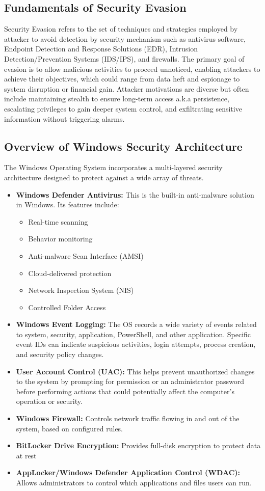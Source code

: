 \documentclass[11pt]{article}
\begin{document}
			\subsection{Fundamentals of Security Evasion}
			Security Evasion refers to the set of techniques and strategies employed by attacker to avoid detection by security mechanism such as antivirus software, Endpoint Detection and Response Solutions (EDR), Intrusion Detection/Prevention Systems (IDS/IPS), and firewalls. The primary goal of evasion is to allow malicious activities to proceed unnoticed, enabling attackers to achieve their objectives, which could range from data heft and espionage to system disruption or financial gain. Attacker motivations are diverse but often include maintaining stealth to ensure long-term access a.k.a persistence, escalating privileges to gain deeper system control, and exfiltrating sensitive information without triggering alarms.
			
			
			\subsection{Overview of Windows Security Architecture}
				The Windows Operating System incorporates a multi-layered security architecture designed to protect against a wide array of threats.
				\begin{itemize}
					\item \textbf{Windows Defender Antivirus:} This is the built-in anti-malware solution in Windows. Its features include:
						\begin{itemize}
							\item Real-time scanning
							\item Behavior monitoring
							\item Anti-malware Scan Interface (AMSI)
							\item Cloud-delivered protection
							\item Network Inspection System (NIS)
							\item Controlled Folder Access
						\end{itemize}
				\item \textbf{Windows Event Logging:} The OS records a wide variety of events related to system, security, application, PowerShell, and other application. Specific event IDs can indicate suspicious activities, login attempts, process creation, and security policy changes.
				\item \textbf{User Account Control (UAC):} This helps prevent unauthorized changes to the system by prompting for permission or an administrator password before performing actions that could potentially affect the computer's operation or security.
				\item \textbf{Windows Firewall:} Controls network traffic flowing in and out of the system, based on configured rules.
				\item \textbf{BitLocker Drive Encryption:} Provides full-disk encryption to protect data at rest
				\item  \textbf{AppLocker/Windows Defender Application Control (WDAC):} Allows administrators to control which applications and files users can run.
				\end{itemize}
				
\end{document}
